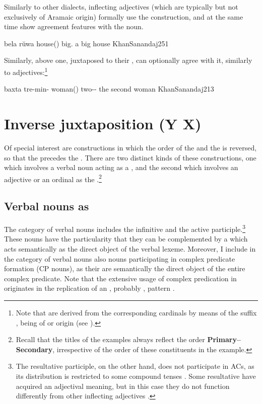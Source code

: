 Similarly to other  dialects, inflecting adjectives (which are typically but not exclusively of Aramaic origin) formally use  the  construction, and at the same time show agreement features with the \prim noun. 

{bela rŭwa}
{house(\masc) big.\masc}
{a big house}
{KhanSanandaj}{251}

Similarly,  above one, juxtaposed to their \prim, can optionally agree with it, similarly to adjectives:\footnote{Note that  are derived from the corresponding cardinals by means of the suffix , being of \Per or \Sor origin (see ).}

{baxta tre-min-}
{woman(\fem) two-\ord-\opt\fem}
{the second woman}
{KhanSanandaj}{213}


\section{Inverse juxtaposition (Y X)} \label{ss:JSan_inverse}

Of special interest are constructions in which the order of the \secn and the \prim is reversed, so that the \secn precedes the \prim. There are two distinct kinds of these constructions, one which involves a verbal noun acting as a \prim, and the second which involves an adjective or an ordinal as the \secn.\footnote{Recall that the titles of the examples always reflect  the order \textbf{Primary--Secondary}, irrespective of the order of these constituents in the example.}

\subsection {Verbal nouns as \prims} \label{ss:JSan_inv_juxt_verbal}

The category of verbal nouns includes the infinitive and the active participle.\footnote{The resultative participle, on the other hand, does not participate in ACs, as its distribution is restricted to some compound tenses \citep[90--96]{KhanSanandaj}. Some resultative  have acquired an adjectival meaning, but in this case they do not function differently from other inflecting adjectives \citep[204]{KhanSanandaj}.} These nouns have the particularity that they can be complemented by a \secn which acts semantically as the direct object of the verbal lexeme. Moreover, I include in the category of verbal nouns also nouns participating in complex predicate formation (CP nouns), as their \secns are semantically the direct object of the entire complex predicate. Note that the extensive usage of complex predication in \JSan originates in the replication of an , probably \Per, pattern \citep[of which see][]{SamvelianComplex}.

